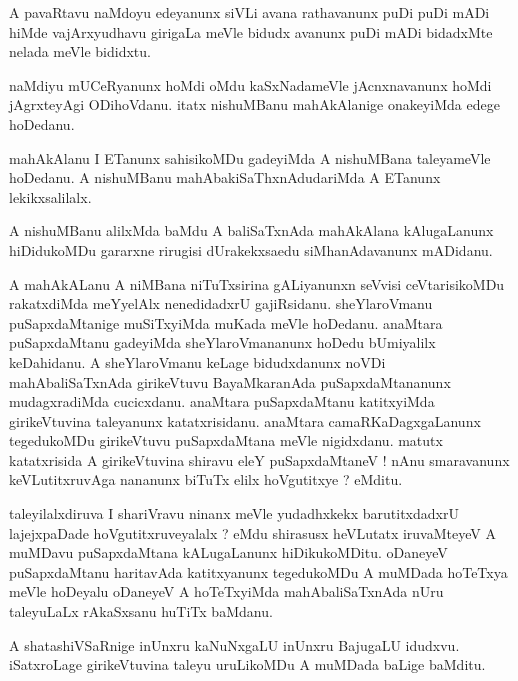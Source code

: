 \documentclass{article}
\begin{document}
\begin{mn}%
A pavaRtavu naMdoyu edeyanunx siVLi avana rathavanunx puDi puDi mADi hiMde vajArxyudhavu 
girigaLa meVle bidudx avanunx puDi mADi bidadxMte nelada meVle bididxtu.
\end{mn}

\begin{mn}%
naMdiyu mUCeRyanunx hoMdi oMdu kaSxNadameVle jAcnxnavanunx hoMdi jAgrxteyAgi ODihoVdanu. 
itatx nishuMBanu mahAkAlanige onakeyiMda edege hoDedanu.
\end{mn}

\begin{mn}%
mahAkAlanu I ETanunx sahisikoMDu gadeyiMda A nishuMBana taleyameVle hoDedanu. A nishuMBanu 
mahAbakiSaThxnAdudariMda A ETanunx lekikxsalilalx.
\end{mn}

\begin{mn}%
A nishuMBanu alilxMda baMdu A baliSaTxnAda mahAkAlana kAlugaLanunx hiDidukoMDu gararxne 
rirugisi dUrakekxsaedu siMhanAdavanunx mADidanu.
\end{mn}

\begin{mn}%
A mahAkALanu A niMBana niTuTxsirina gALiyanunxn seVvisi ceVtarisikoMDu rakatxdiMda meYyelAlx 
nenedidadxrU gajiRsidanu. sheYlaroVmanu puSapxdaMtanige muSiTxyiMda muKada meVle hoDedanu. 
anaMtara puSapxdaMtanu gadeyiMda sheYlaroVmananunx hoDedu bUmiyalilx keDahidanu. A 
sheYlaroVmanu keLage bidudxdanunx noVDi mahAbaliSaTxnAda girikeVtuvu BayaMkaranAda 
puSapxdaMtananunx mudagxradiMda cucicxdanu. anaMtara puSapxdaMtanu katitxyiMda  
girikeVtuvina taleyanunx katatxrisidanu. anaMtara camaRKaDagxgaLanunx tegedukoMDu 
girikeVtuvu puSapxdaMtana meVle nigidxdanu. matutx katatxrisida A girikeVtuvina shiravu eleY 
puSapxdaMtaneV ! nAnu smaravanunx keVLutitxruvAga nananunx biTuTx elilx hoVgutitxye ? eMditu.
\end{mn}

\begin{mn}%
taleyilalxdiruva I shariVravu ninanx meVle yudadhxkekx barutitxdadxrU lajejxpaDade 
hoVgutitxruveyalalx ? eMdu shirasusx heVLutatx iruvaMteyeV A muMDavu puSapxdaMtana 
kALugaLanunx hiDikukoMDitu. oDaneyeV puSapxdaMtanu haritavAda katitxyanunx tegedukoMDu A 
muMDada hoTeTxya meVle hoDeyalu oDaneyeV A hoTeTxyiMda mahAbaliSaTxnAda nUru taleyuLaLx 
rAkaSxsanu huTiTx baMdanu.
\end{mn}

\begin{mn}%
A shatashiVSaRnige inUnxru kaNuNxgaLU inUnxru BajugaLU idudxvu. iSatxroLage girikeVtuvina 
taleyu uruLikoMDu A muMDada baLige baMditu.
\end{mn}
\end{document}
